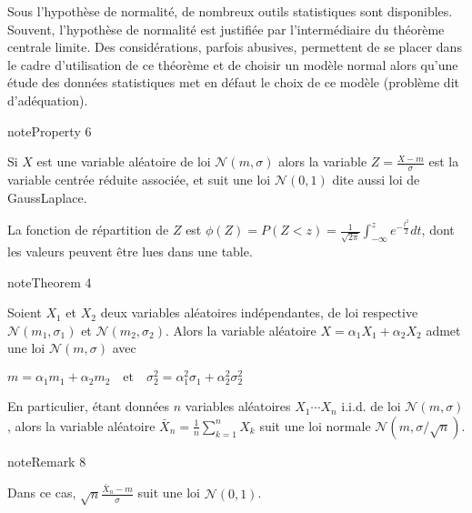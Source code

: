 \documentclass[letterpaper,10pt,french]{sphinxmanual}
\begin{document}
\sphinxAtStartPar
Sous l’hypothèse de normalité, de nombreux outils statistiques sont disponibles. Souvent, l’hypothèse de normalité est justifiée par l’intermédiaire du théorème centrale limite. Des considérations, parfois abusives, permettent de se placer dans le cadre d’utilisation de ce théorème et de choisir un modèle normal alors qu’une étude des données statistiques met en défaut le choix de ce modèle (problème dit d’adéquation).
\label{elemstats:property-8}
\begin{sphinxadmonition}{note}{Property 6}



\sphinxAtStartPar
Si \(X\) est une variable aléatoire de loi \(\mathcal{N}(m,\sigma)\) alors la variable \(Z=\frac{X-m}{\sigma}\) est la variable centrée réduite associée, et suit une loi \(\mathcal{N}(0,1)\) dite aussi loi de Gauss\sphinxhyphen{}Laplace.
\end{sphinxadmonition}

\sphinxAtStartPar
La fonction de répartition de \(Z\) est \(\phi(Z) = P(Z<z) = \frac{1}{\sqrt{2\pi}}\int_{-\infty}^z e^{-\frac{t^2}{2}}dt\), dont les valeurs peuvent être lues dans une table.
\label{elemstats:theorem-9}
\begin{sphinxadmonition}{note}{Theorem 4}



\sphinxAtStartPar
Soient \(X_1\) et \(X_2\) deux variables aléatoires indépendantes, de loi respective \(\mathcal{N}(m_1,\sigma_1)\) et \(\mathcal{N}(m_2,\sigma_2)\). Alors la variable aléatoire \(X=\alpha_1X_1+\alpha_2X_2\) admet une loi \(\mathcal{N}(m,\sigma)\) avec

\sphinxAtStartPar
\(m = \alpha_1 m_1+\alpha_2 m_2\quad \textrm{et}\quad \sigma_2^2 = \alpha_1^2 \sigma_1+\alpha_2^2 \sigma_2^2\)

\sphinxAtStartPar
En particulier, étant données \(n\) variables aléatoires \(X_1\cdots X_n\) i.i.d. de loi \(\mathcal{N}(m,\sigma)\), alors la variable aléatoire \(\bar X_n = \frac1n \displaystyle\sum_{k=1}^nX_k\) suit une loi normale \(\mathcal{N}(m,\sigma/\sqrt{n})\).
\end{sphinxadmonition}
\label{elemstats:remark-10}
\begin{sphinxadmonition}{note}{Remark 8}



\sphinxAtStartPar
Dans ce cas, \(\sqrt{n}\frac{\bar X_n-m}{\sigma}\) suit une loi \(\mathcal{N}(0,1)\).
\end{sphinxadmonition}
\end{document}
